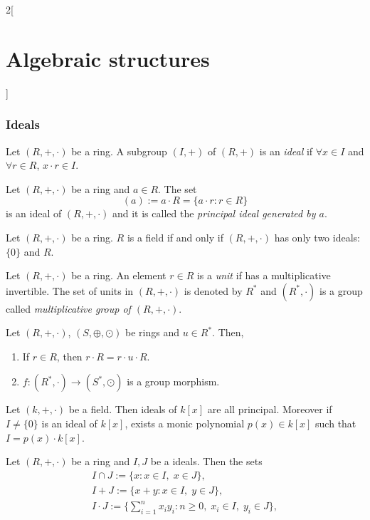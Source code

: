 \documentclass[../../../main.tex]{subfiles}
\begin{document}
\begin{multicols}{2}[\section{Algebraic structures}]
\subsubsection*{Ideals}
\begin{definition}
    Let $(R,+,\cdot)$ be a ring. A subgroup $(I,+)$ of $(R,+)$ is an \textit{ideal} if $\forall x\in I$ and $\forall r\in R$, $x\cdot r\in I$.
\end{definition}
\begin{lemma}
    Let $(R,+,\cdot)$ be a ring and $a\in R$. The set $$(a):=a\cdot R=\{a\cdot r:r\in R\}$$ is an ideal of $(R,+,\cdot)$ and it is called the \textit{principal ideal generated by $a$}.
\end{lemma}
\begin{prop}
    Let $(R,+,\cdot)$ be a ring. $R$ is a field if and only if $(R,+,\cdot)$ has only two ideals: $\{0\}$ and $R$.
\end{prop}
\begin{definition}
    Let $(R,+,\cdot)$ be a ring. An element $r\in R$ is a \textit{unit} if has a multiplicative invertible. The set of units in $(R,+,\cdot)$ is denoted by $R^*$ and $(R^*,\cdot)$ is a group called \textit{multiplicative group of $(R,+,\cdot)$}.
\end{definition}
\begin{lemma}
    Let $(R,+,\cdot)$, $(S,\oplus,\odot)$ be rings and $u\in R^*$. Then,
    \begin{enumerate}
        \item If $r\in R$, then $r\cdot R=r\cdot u\cdot R$.
        \item $f:(R^*,\cdot)\rightarrow (S^*,\odot)$ is a group morphism.
    \end{enumerate}
\end{lemma}
\begin{prop}
    Let $(k,+,\cdot)$ be a field. Then ideals of $k[x]$ are all principal. Moreover if $I\ne\{0\}$ is an ideal of $k[x]$, exists a monic polynomial $p(x)\in k[x]$ such that $I=p(x)\cdot k[x]$.
\end{prop}
\begin{prop}
    Let $(R,+,\cdot)$ be a ring and $I, J$ be a ideals. Then the sets
    \begin{gather*}
        I\cap J:=\{x:x\in I,\;x\in J\},\\
        I+J:=\{x+y:x\in I,\;y\in J\},\\
        I\cdot J:=\{\sum_{i=1}^nx_iy_i:n\geq 0,\;x_i\in I,\;y_i\in J\},
    \end{gather*}

\end{prop}
\end{multicols}
\end{document}
